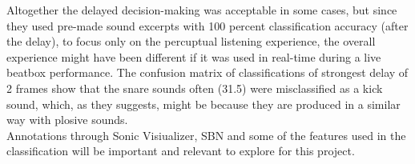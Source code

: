 Altogether the delayed decision-making was acceptable in some cases, but since they used pre-made sound excerpts with 100 percent classification accuracy (after the delay), to focus only on the percuptual listening experience, the overall experience might have been different if it was used in real-time during a live beatbox performance. 
The confusion matrix of classifications of strongest delay of 2 frames show that the snare sounds often (31.5) were misclassified as a kick sound, which, as they suggests, might be because they are produced in a similar way with plosive sounds. \\
Annotations through Sonic Visiualizer, SBN and some of the features used in the classification will be important and relevant to explore for this project.